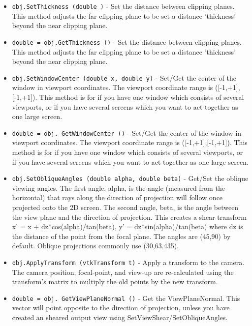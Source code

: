 \begin{itemize}
\item  \verb|obj.SetThickness (double )| -  Set the distance between clipping planes.  This method adjusts the 
 far clipping plane to be set a distance 'thickness' beyond the
 near clipping plane.

\item  \verb|double = obj.GetThickness ()| -  Set the distance between clipping planes.  This method adjusts the 
 far clipping plane to be set a distance 'thickness' beyond the
 near clipping plane.

\item  \verb|obj.SetWindowCenter (double x, double y)| -  Set/Get the center of the window in viewport coordinates.
 The viewport coordinate range is ([-1,+1],[-1,+1]).  This method
 is for if you have one window which consists of several viewports,
 or if you have several screens which you want to act together as
 one large screen.

\item  \verb|double = obj. GetWindowCenter ()| -  Set/Get the center of the window in viewport coordinates.
 The viewport coordinate range is ([-1,+1],[-1,+1]).  This method
 is for if you have one window which consists of several viewports,
 or if you have several screens which you want to act together as
 one large screen.

\item  \verb|obj.SetObliqueAngles (double alpha, double beta)| -  Get/Set the oblique viewing angles.  The first angle, alpha, is the
 angle (measured from the horizontal) that rays along the direction
 of projection will follow once projected onto the 2D screen.  
 The second angle, beta, is the angle between the view plane and
 the direction of projection.  This creates a shear transform
 x' = x + dz*cos(alpha)/tan(beta), y' = dz*sin(alpha)/tan(beta)
 where dz is the distance of the point from the focal plane.
 The angles are (45,90) by default.  Oblique projections 
 commonly use (30,63.435).

\item  \verb|obj.ApplyTransform (vtkTransform t)| -  Apply a transform to the camera.  The camera position, focal-point,
 and view-up are re-calculated using the transform's matrix to
 multiply the old points by the new transform.

\item  \verb|double = obj. GetViewPlaneNormal ()| -  Get the ViewPlaneNormal.  This vector will point opposite to
 the direction of projection, unless you have created an sheared output
 view using SetViewShear/SetObliqueAngles.


\end{itemize}
